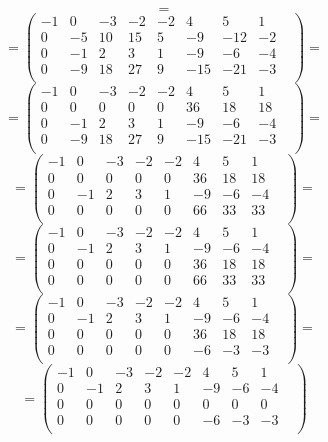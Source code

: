 \documentclass[a4paper,12pt]{article}
\begin{document}
\begin{itemize}
\[=
\]
\[
=
\begin{pmatrix}
-1 & 0 & -3 & -2 & -2 & 4 & 5 & 1 & \\
0 & -5 & 10 & 15 & 5 & -9 & -12 & -2 & \\
0 & -1 & 2 & 3 & 1 & -9 & -6 & -4 & \\
0 & -9 & 18 & 27 & 9 & -15 & -21 & -3 & \\
\end{pmatrix}
=
\]
\[
=
\begin{pmatrix}
-1 & 0 & -3 & -2 & -2 & 4 & 5 & 1 & \\
0 & 0 & 0 & 0 & 0 & 36 & 18 & 18 & \\
0 & -1 & 2 & 3 & 1 & -9 & -6 & -4 & \\
0 & -9 & 18 & 27 & 9 & -15 & -21 & -3 & \\
\end{pmatrix}
=
\]
\[
=
\begin{pmatrix}
-1 & 0 & -3 & -2 & -2 & 4 & 5 & 1 & \\
0 & 0 & 0 & 0 & 0 & 36 & 18 & 18 & \\
0 & -1 & 2 & 3 & 1 & -9 & -6 & -4 & \\
0 & 0 & 0 & 0 & 0 & 66 & 33 & 33 & \\
\end{pmatrix}
=
\]
\[
=
\begin{pmatrix}
-1 & 0 & -3 & -2 & -2 & 4 & 5 & 1 & \\
0 & -1 & 2 & 3 & 1 & -9 & -6 & -4 & \\
0 & 0 & 0 & 0 & 0 & 36 & 18 & 18 & \\
0 & 0 & 0 & 0 & 0 & 66 & 33 & 33 & \\
\end{pmatrix}
=
\]
\[
=
\begin{pmatrix}
-1 & 0 & -3 & -2 & -2 & 4 & 5 & 1 & \\
0 & -1 & 2 & 3 & 1 & -9 & -6 & -4 & \\
0 & 0 & 0 & 0 & 0 & 36 & 18 & 18 & \\
0 & 0 & 0 & 0 & 0 & -6 & -3 & -3 & \\
\end{pmatrix}
=
\]
\[
=
\begin{pmatrix}
-1 & 0 & -3 & -2 & -2 & 4 & 5 & 1 & \\
0 & -1 & 2 & 3 & 1 & -9 & -6 & -4 & \\
0 & 0 & 0 & 0 & 0 & 0 & 0 & 0 & \\
0 & 0 & 0 & 0 & 0 & -6 & -3 & -3 & \\
\end{pmatrix}
\]
\end{itemize}
\end{document}

